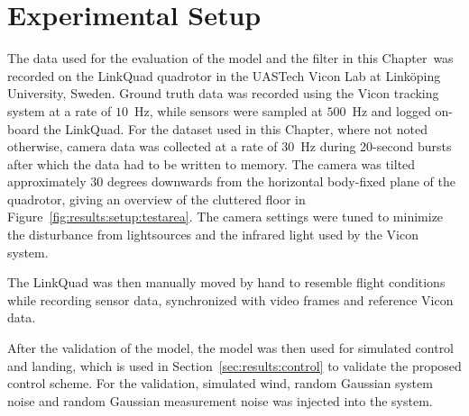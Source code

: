 \section{Experimental Setup}
    The data used for the evaluation of the model and the filter in
    this Chapter~was recorded on the LinkQuad quadrotor in the UASTech Vicon Lab
    at Linköping University, Sweden. Ground truth data was recorded using
    the Vicon tracking system at a rate of $10$~Hz, while sensors were sampled
    at $500$~Hz and logged on-board the LinkQuad.
    For the dataset used in this Chapter, where not noted otherwise,
    camera data was collected at a rate of $30$~Hz during 20-second bursts after
    which the data had to be written to memory.
    The camera was tilted approximately $30$ degrees downwards from the
    horizontal body-fixed plane of the quadrotor, giving an overview of the cluttered
    floor in Figure~\ref{fig:results:setup:testarea}.
    The camera settings were tuned to minimize the disturbance from lightsources
    and the infrared light used by the Vicon system.

    The LinkQuad was then manually moved by hand to resemble flight conditions
    while recording sensor data, synchronized with video frames and reference Vicon data.


    After the validation of the model, the model was then used for simulated
    control and landing, which is used in Section~\ref{sec:results:control}
    to validate the proposed control scheme. For the validation, simulated wind, random Gaussian
    system noise and random Gaussian measurement noise was injected into
    the system.
